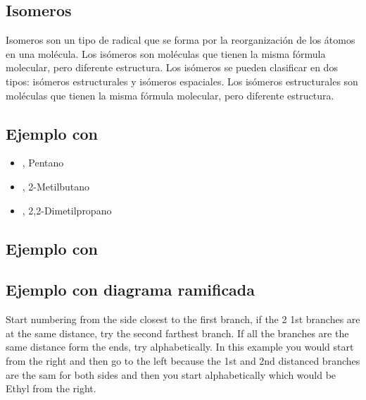 \subsection{Isomeros}
Isomeros son un tipo de radical que se forma por la reorganización de los átomos en una molécula. Los isómeros son moléculas que tienen la misma fórmula molecular, pero diferente estructura. Los isómeros se pueden clasificar en dos tipos: isómeros estructurales y isómeros espaciales. Los isómeros estructurales son moléculas que tienen la misma fórmula molecular, pero diferente estructura.
\subsection*{Ejemplo con }

\begin{itemize}
    \item {}, Pentano
    \item {}, 2-Metilbutano
    \item {}, 2,2-Dimetilpropano
    \end{itemize}
    \qquad
    \subsection*{Ejemplo con }
    \qquad
\subsection*{Ejemplo con diagrama ramificada}
\begin{center}
\end{center}
Start numbering from the side closest to the first branch, if the 2 1st branches are at the same distance, try the second farthest branch. If all the branches are the same distance form the ends, try alphabetically. In this example you would start from the right and then go to the left because the 1st and 2nd distanced branches are the sam for both sides and then you start alphabetically which would be Ethyl from the right.


